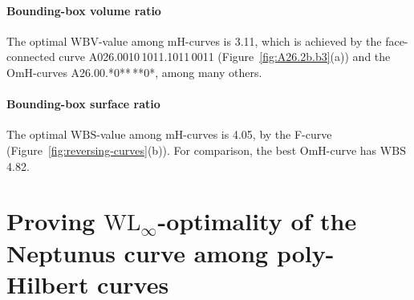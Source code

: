 \documentclass[11pt,a4paper]{article}
\def\WLMax{\ensuremath{\mathrm{WL}_\infty}\xspace}
\def\WBV{\ensuremath{\mathrm{WBV}}\xspace}
\def\WBS{\ensuremath{\mathrm{WBS}}\xspace}
\begin{document}
{\paragraph{Bounding-box volume ratio}
The optimal \WBV-value among mH-curves is 3.11, which is achieved by the face-connected curve A026.0010\,1011.1011\,0011 (Figure~\ref{fig:A26.2b.b3}(a)) and the OmH-curves A26.00.*0**\,**0*, among many others.

\paragraph{Bounding-box surface ratio}
The optimal \WBS-value among mH-curves is 4.05, by the F-curve (Figure~\ref{fig:reversing-curves}(b)). For comparison, the best OmH-curve has \WBS 4.82.

}

\section{Proving \WLMax-optimality of the Neptunus curve among poly-Hilbert curves}
\end{document}
